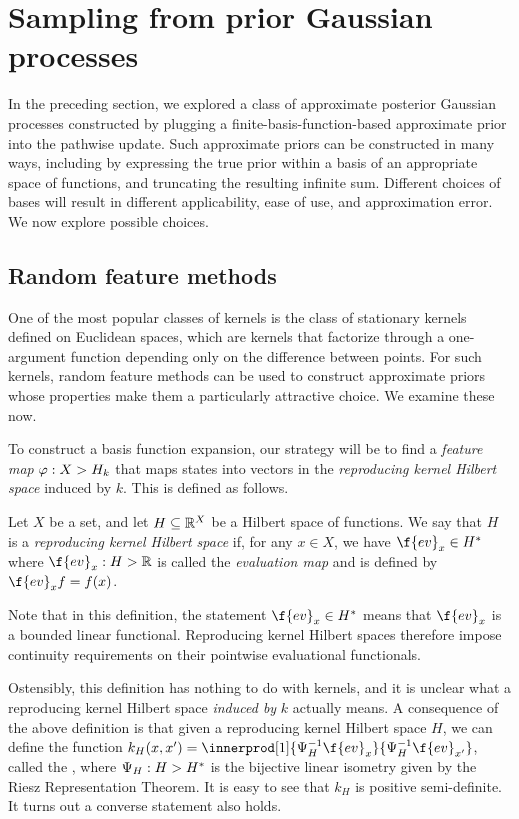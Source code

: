\documentclass[11pt]{book}
\begin{document}
\section{Sampling from prior Gaussian processes}

In the preceding section, we explored a class of approximate posterior Gaussian processes constructed by plugging a finite-basis-function-based approximate prior into the pathwise update.
Such approximate priors can be constructed in many ways, including by expressing the true prior within a basis of an appropriate space of functions, and truncating the resulting infinite sum.
Different choices of bases will result in different applicability, ease of use, and approximation error.
We now explore possible choices.


\subsection{Random feature methods}

One of the most popular classes of kernels is the class of stationary kernels defined on Euclidean spaces, which are kernels that factorize through a one-argument function depending only on the difference between points.
For such kernels, random feature methods can be used to construct approximate priors whose properties make them a particularly attractive choice.
We examine these now.

To construct a basis function expansion, our strategy will be to find a \emph{feature map} $\varphi : X \-> H_k$ that maps states into vectors in the \emph{reproducing kernel Hilbert space} induced by $k$.
This is defined as follows.

\begin{definition}
Let $X$ be a set, and let $H \subseteq \mathbb{R}^X$ be a Hilbert space of functions. 
We say that $H$ is a \emph{reproducing kernel Hilbert space} if, for any $x\in X$, we have $\f{ev}_x \in H^*$ where $\f{ev}_x : H \-> \R$ is called the \emph{evaluation map} and is defined by $\f{ev}_x f = f(x)$.
\end{definition}

Note that in this definition, the statement $\f{ev}_x \in H^*$ means that $\f{ev}_x$ is a bounded linear functional.
Reproducing kernel Hilbert spaces therefore impose continuity requirements on their pointwise evaluational functionals.

Ostensibly, this definition has nothing to do with kernels, and it is unclear what a reproducing kernel Hilbert space \emph{induced by} $k$ actually means.
A consequence of the above definition is that given a reproducing kernel Hilbert space $H$, we can define the function $k_{H}(x,x') = \innerprod[1]{\Psi_{H}^{-1}\f{ev}_x}{\Psi^{-1}_{H}\f{ev}_{x'}}$, called the , where $\Psi_{H} : H \-> H^*$ is the bijective linear isometry given by the Riesz Representation Theorem.
It is easy to see that $k_{H}$ is positive semi-definite.
It turns out a converse statement also holds.
\end{document}
